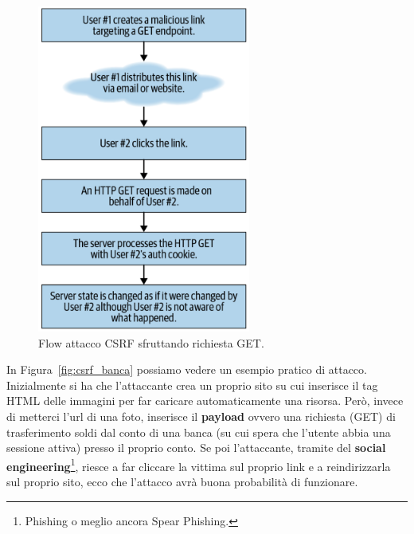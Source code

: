 \begin{figure}[H]
	\centering
	\includegraphics[width=7cm, keepaspectratio]{capitoli/web_security/imgs/get_flow.png}
	\caption{Flow attacco CSRF sfruttando richiesta GET.}
\end{figure}

In Figura~\ref{fig:csrf_banca} possiamo vedere un esempio pratico di attacco. Inizialmente si ha che l'attaccante crea un proprio sito su cui inserisce il tag HTML delle immagini per far caricare automaticamente una risorsa. Però, invece di metterci l'url di una foto, inserisce il \textbf{payload} ovvero una richiesta (GET) di trasferimento soldi dal conto di una banca (su cui spera che l'utente abbia una sessione attiva) presso il proprio conto. Se poi l'attaccante, tramite del \textbf{social engineering}\footnote{Phishing o meglio ancora Spear Phishing.}, riesce a far cliccare la vittima sul proprio link e a reindirizzarla sul proprio sito, ecco che l'attacco avrà buona probabilità di funzionare.

